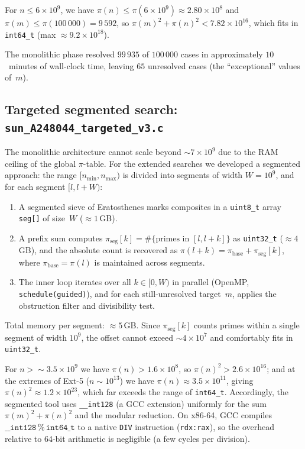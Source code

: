 \documentclass[11pt]{article}
\theoremstyle{definition}
\theoremstyle{remark}
\numberwithin{equation}{section}
\begin{document}
For $n \le 6 \times 10^9$, we have $\pi(n) \le \pi(6 \times 10^9)
\approx 2.80 \times 10^8$ and $\pi(m) \le \pi(100\,000)
= 9\,592$, so $\pi(m)^2 + \pi(n)^2 < 7.82 \times 10^{16}$, which
fits in \texttt{int64\_t} (max $\approx 9.2 \times 10^{18}$).

The monolithic phase resolved $99\,935$ of $100\,000$ cases in
approximately $10$~minutes of wall-clock time, leaving $65$
unresolved cases (the ``exceptional'' values of~$m$).

\subsection[Targeted segmented search: sun-A248044-targeted-v3.c]{Targeted segmented search: \texttt{sun\_A248044\_targeted\_v3.c}}
\label{sec:targeted}

The monolithic architecture cannot scale beyond
$\sim 7 \times 10^9$ due to the RAM ceiling of the global
$\pi$-table.
For the extended searches we developed a segmented approach:
the range $[n_{\min}, n_{\max})$ is divided into segments of width
$W = 10^9$, and for each segment $[l, l+W)$:

\begin{enumerate}
\item A segmented sieve of Eratosthenes marks composites in
  a \texttt{uint8\_t} array \texttt{seg[]} of size~$W$
  ($\approx 1$\,GB).
\item A prefix sum computes $\pi_{\mathrm{seg}}[k]
  = \#\{\text{primes in } [l, l+k]\}$ as \texttt{uint32\_t}
  ($\approx 4$\,GB), and the absolute count is recovered as
  $\pi(l+k) = \pi_{\mathrm{base}} + \pi_{\mathrm{seg}}[k]$,
  where $\pi_{\mathrm{base}} = \pi(l)$ is maintained across
  segments.
\item The inner loop iterates over all $k \in [0, W)$ in parallel
  (OpenMP, \texttt{schedule(guided)}), and for each still-unresolved
  target~$m$, applies the obstruction filter and divisibility test.
\end{enumerate}

Total memory per segment: $\approx 5$\,GB.  Since $\pi_{\mathrm{seg}}[k]$
counts primes within a single segment of width $10^9$, the offset
cannot exceed $\sim 4 \times 10^7$ and comfortably fits in
\texttt{uint32\_t}.

For $n > \sim 3.5 \times 10^9$ we have $\pi(n) > 1.6 \times 10^8$,
so $\pi(n)^2 > 2.6 \times 10^{16}$; and at the extremes of Ext-5
($n \sim 10^{13}$) we have $\pi(n) \approx 3.5 \times 10^{11}$, giving
$\pi(n)^2 \approx 1.2 \times 10^{23}$, which far exceeds the range
of \texttt{int64\_t}.  Accordingly, the segmented tool uses
\texttt{\_\_int128} (a GCC extension) uniformly for the sum
$\pi(m)^2 + \pi(n)^2$ and the modular reduction.
On x86-64, GCC compiles $\mathtt{\_\_int128} \mathbin{\%}
\mathtt{int64\_t}$ to a native \texttt{DIV} instruction
(\texttt{rdx:rax}), so the overhead relative to 64-bit arithmetic
is negligible (a few cycles per division).
\end{document}
